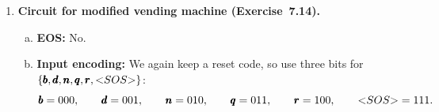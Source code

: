 \begin{enumerate}[{7.}1.]
\begin{enumerate}[(a)]
  \item \textbf{$w_2$ truth table and Boolean function:}
  \[
  \begin{array}{c|ccccc}
  & \pmb{b} & \pmb{d} & \pmb{n} & \pmb{q} & \<SOS\> \\
  \hline
  s_0   & 0&0&0&0&0\\
  s_1   & 0&0&0&0&0\\
  s_2   & 0&0&0&0&0\\
  s_3   & 0&0&0&0&0\\
  s_4   & 0&0&0&0&0\\
  s_5   & 0&0&0&0&0\\
  s_6   & 0&0&1&1&0\\
  s_7   & 0&0&1&1&0\\
  s_8   & 1&0&1&1&0\\
  s_9   & 1&0&1&1&0\\
  s_{10}& 0&0&1&1&0
  \end{array}
  \]
  and a minimized form is
  \[
    w_2=(t_4\wedge \neg t_2\wedge \neg a_1)\ \vee\
        (t_3\wedge t_2\wedge \neg a_3\wedge a_2)\ \vee\
        (t_4\wedge \neg a_3\wedge a_2).
  \]

  \item The complete circuit uses four D flip-flops for the state bits
  $t_1,t_2,t_3,t_4$, three input lines $a_1,a_2,a_3$, and four output networks
  $w_1,w_2,w_3,w_4$.  The full transition/output table is exactly the one read
  from Figure~7.2: for $0\leq i\leq 5$, pushing $\pmb{b}$ leaves $s_i$ fixed with
  output $\pmb{\varphi}$, while $\pmb{n},\pmb{d},\pmb{q}$ send $s_i$ to
  $s_{i+1},s_{i+2},s_{i+5}$ with output $\pmb{\varphi}$; for $6\leq i\leq 10$,
  pushing $\pmb{b}$ sends $s_i$ to $s_0$ with output $\pmb{c}_{i-6}$, while
  $\pmb{n},\pmb{d},\pmb{q}$ self-loop with outputs $\pmb{n'},\pmb{d'},\pmb{q'}$;
  and $\<SOS\>$ sends every real state to $s_0$ with output
  $\pmb{\varphi}$.  The other next-state bits and output bits are obtained from
  this same table in exactly the same way.
\end{enumerate}

\item \textbf{Circuit for modified vending machine (Exercise~7.14).}

\begin{enumerate}[(a)]
  \item \textbf{EOS:} No.

  \item \textbf{Input encoding:}  We again keep a reset code, so use three bits
  for
  $\{\pmb{b},\pmb{d},\pmb{n},\pmb{q},\pmb{r},\text{\textless}SOS\text{\textgreater}\}$:
  \[
    \pmb{b}=000,\qquad \pmb{d}=001,\qquad \pmb{n}=010,\qquad
    \pmb{q}=011,\qquad \pmb{r}=100,\qquad \text{\textless}SOS\text{\textgreater}=111.
  \]


\end{enumerate}
\end{enumerate}
